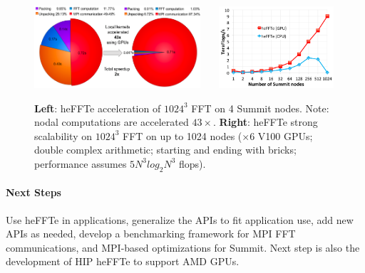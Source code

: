 \begin{figure}[htb]
   \centering
   \includegraphics[width=0.55\textwidth]{projects/2.3.3-MathLibs/2.3.3.13-CLOVER/heFFTeAcceleration}~~~
   \includegraphics[width=0.38\textwidth]{projects/2.3.3-MathLibs/2.3.3.13-CLOVER/heFFTeScalability}
    \caption{\label{fig:fft-ecp-progress}
    {\bf Left}: heFFTe acceleration of $1024^3$ FFT on 4 Summit nodes.
                Note: nodal computations are accelerated $43\times$. 
    {\bf Right}: heFFTe strong scalability on $1024^3$ 
                FFT on up to 1024 nodes ($\times 6$ V100 GPUs;
                double complex arithmetic; starting and ending with bricks; 
                performance assumes $5 N^3 log_2 N^3$ flops).}
\end{figure}


\paragraph{Next Steps}
Use heFFTe in applications, generalize the APIs to fit application use,
add new APIs as needed, develop a benchmarking framework for MPI FFT 
communications, and MPI-based optimizations for Summit. 
Next step is also the development of HIP heFFTe to support AMD GPUs. 
